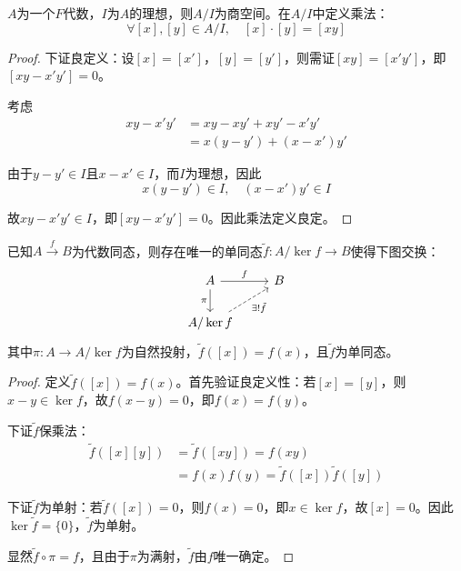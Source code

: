 \documentclass[lang=cn,a4paper,newtx,section]{elegantbook}
\begin{document}
\begin{definition}[商代数]
  $A$为一个$F$代数，$I$为$A$的理想，则$A/I$为商空间。在$A/I$中定义乘法：
  \begin{equation*}
    \forall [x], [y] \in A/I, \quad [x] \cdot [y] = [xy]
  \end{equation*}
\end{definition}

\begin{proof}
  下证良定义：设$[x] = [x']$，$[y] = [y']$，则需证$[xy] = [x'y']$，即$[xy - x'y'] = 0$。
  
  考虑
  \begin{align*}
    xy - x'y' &= xy - xy' + xy' - x'y' \\
    &= x(y - y') + (x - x')y'
  \end{align*}
  
  由于$y - y' \in I$且$x - x' \in I$，而$I$为理想，因此
  \begin{equation*}
    x(y - y') \in I, \quad (x - x')y' \in I
  \end{equation*}
  
  故$xy - x'y' \in I$，即$[xy - x'y'] = 0$。因此乘法定义良定。
\end{proof}

\begin{theorem}[同态基本定理]
  已知$A \xrightarrow{f} B$为代数同态，则存在唯一的单同态$\tilde{f}: A/\ker f \to B$使得下图交换：
  \begin{equation*}
    \begin{tikzcd}
      A \arrow[r, "f"] \arrow[d, "\pi"'] & B \\
      A/\ker f \arrow[ur, "\exists! \tilde{f}"', dashed]
    \end{tikzcd}
  \end{equation*}
  其中$\pi: A \to A/\ker f$为自然投射，$\tilde{f}([x]) = f(x)$，且$\tilde{f}$为单同态。
\end{theorem}

\begin{proof}
  定义$\tilde{f}([x]) = f(x)$。首先验证良定义性：若$[x] = [y]$，则$x - y \in \ker f$，故$f(x - y) = 0$，即$f(x) = f(y)$。
  
  下证$\tilde{f}$保乘法：
  \begin{align*}
    \tilde{f}([x][y]) &= \tilde{f}([xy]) = f(xy) \\
    &= f(x)f(y) = \tilde{f}([x])\tilde{f}([y])
  \end{align*}
  
  下证$\tilde{f}$为单射：若$\tilde{f}([x]) = 0$，则$f(x) = 0$，即$x \in \ker f$，故$[x] = 0$。因此$\ker \tilde{f} = \{0\}$，$\tilde{f}$为单射。
  
  显然$\tilde{f} \circ \pi = f$，且由于$\pi$为满射，$\tilde{f}$由$f$唯一确定。
\end{proof}
\end{document}
